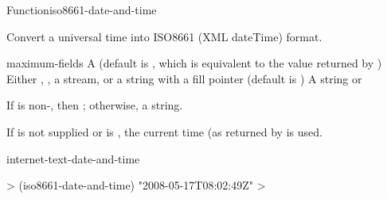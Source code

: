\documentclass[10pt,twoside,english,pdftex]{article}
\begin{document}

\begin{functiondoc}{Function}{iso8661-date-and-time}{%
      
      
   \returns{} }
% 

\fnsyntax

\fnpurpose Convert a universal time into ISO8661 (XML dateTime) format.

\fnpackage {}

\fnmodule {}

\fnargs
\begin{args}{maximum-fields}
 A  (default is \nil,
  which is equivalent to the value returned by
  )
\arg[destination] Either \nil, , a stream, or a string with a fill 
pointer (default is \nil)
\arg[result] A string or \nil{}
\end{args}

\fnreturns If  is non-\nil, then \nil; otherwise, a string.

\fndescription
{}%
%
If  is not supplied or is \nil, the current time
(as returned by  is used.

\begin{alsos}{internet-text-date-and-time}
\end{alsos}

\fnexample
%
\W\supp
\begin{example}
  > (iso8661-date-and-time)
  "2008-05-17T08:02:49Z"
  >
\end{example}

\end{functiondoc}

\end{document}

